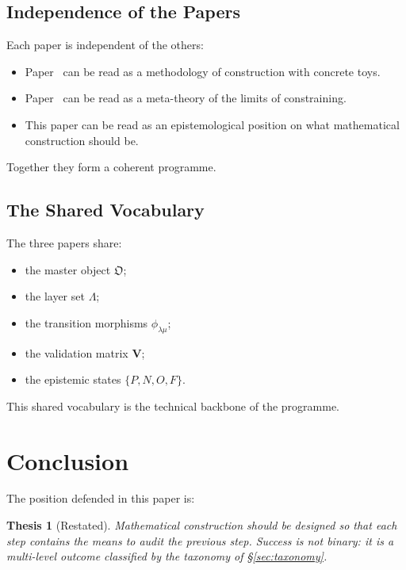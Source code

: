 \documentclass[11pt,a4paper]{article}
\theoremstyle{definition}
\theoremstyle{plain}
\newtheorem{thesis}[definition]{Thesis}
\begin{document}
\subsection{Independence of the Papers}

Each paper is independent of the others:
\begin{itemize}
  \item Paper~\cite{paperI} can be read as a methodology of
        construction with concrete toys.
  \item Paper~\cite{paperII} can be read as a meta-theory of the
        limits of constraining.
  \item This paper can be read as an epistemological position on
        what mathematical construction should be.
\end{itemize}
Together they form a coherent programme.

\subsection{The Shared Vocabulary}

The three papers share:
\begin{itemize}
  \item the master object $\mathfrak O$;
  \item the layer set $\Lambda$;
  \item the transition morphisms $\phi_{\lambda\mu}$;
  \item the validation matrix $\mathbf V$;
  \item the epistemic states $\{P, N, O, F\}$.
\end{itemize}
This shared vocabulary is the technical backbone of the programme.

\section{Conclusion}
\label{sec:conclusion}

The position defended in this paper is:

\begin{thesis}[Restated]
Mathematical construction should be designed so that each step
contains the means to audit the previous step. Success is not
binary: it is a multi-level outcome classified by the taxonomy of
\S\ref{sec:taxonomy}.
\end{thesis}
\end{document}

